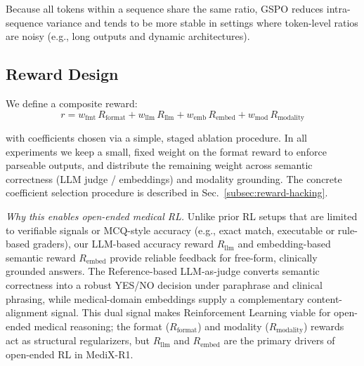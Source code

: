 \documentclass{article}
\theoremstyle{plain}
\theoremstyle{definition}
\theoremstyle{remark}
\begin{document}
Because all tokens within a sequence share the same ratio, GSPO reduces intra-sequence variance and tends to be more stable in settings where token-level ratios are noisy (e.g., long outputs and dynamic architectures).


\subsection{Reward Design}
\label{subsec:rewards}
We define a composite reward:
{\small
\[
r = w_{\text{fmt}}\,R_{\text{format}} + w_{\text{llm}}\,R_{\text{llm}}+ w_{\text{emb}}\,R_{\text{embed}} + w_{\text{mod}}\,R_{\text{modality}}
\]
}

with coefficients chosen via a simple, staged ablation procedure. In all experiments we keep a small, fixed weight on the format reward to enforce parseable outputs, and distribute the remaining weight across semantic correctness (LLM judge / embeddings) and modality grounding. The concrete coefficient selection procedure is described in Sec.~\ref{subsec:reward-hacking}.


\textit{Why this enables open-ended medical RL.} Unlike prior RL setups that are limited to verifiable signals or MCQ-style accuracy (e.g., exact match, executable or rule-based graders), our LLM-based accuracy reward $R_{\text{llm}}$ and embedding-based semantic reward $R_{\text{embed}}$ provide reliable feedback for free-form, clinically grounded answers. The Reference-based LLM-as-judge converts semantic correctness into a robust YES/NO decision under paraphrase and clinical phrasing, while medical-domain embeddings supply a complementary content-alignment signal. This dual signal makes Reinforcement Learning viable for open-ended medical reasoning; the format ($R_{\text{format}}$) and modality ($R_{\text{modality}}$) rewards act as structural regularizers, but $R_{\text{llm}}$ and $R_{\text{embed}}$ are the primary drivers of open-ended RL in MediX-R1. 
\end{document}
